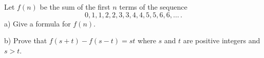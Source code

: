 Let $f(n)$ be the sum of the first $n$ terms of the sequence \[ 0, 1,1, 2,2, 3,3, 4,4, 5,5, 6,6, \ldots\, .  \] a) Give a formula for $f(n)$.

b) Prove that $f(s+t)-f(s-t)=st$ where $s$ and $t$ are positive integers and $s>t$.